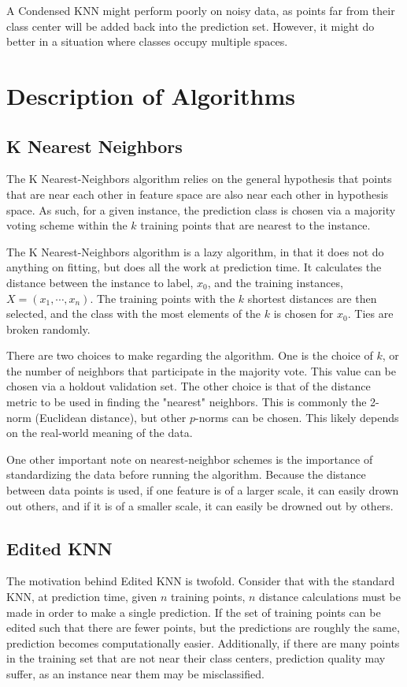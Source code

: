 \documentclass{amsart}
\begin{document}
    A Condensed KNN might perform poorly on noisy
    data, as points far from their class center will be added back into the prediction set.
    However, it might do better in a situation where classes occupy multiple spaces.

    \section{Description of Algorithms}
    \subsection*{K Nearest Neighbors}
    The K Nearest-Neighbors algorithm relies on the general hypothesis that points
    that are near each other in feature space are also near each other in hypothesis space.
    As such, for a given instance, the prediction class is chosen via a majority
    voting scheme within the $k$ training points that are nearest to the instance.

    The K Nearest-Neighbors algorithm is a lazy algorithm, in that it does not
    do anything on fitting, but does all the work at prediction time. It calculates the
    distance between the instance to label, $x_0$, and the training instances, $X = (x_1, \cdots, x_n)$.
    The training points with the $k$ shortest distances are then selected, and the class with the
    most elements of the $k$ is chosen for $x_0$. Ties are broken randomly.

    There are two choices to make regarding the algorithm. One is the choice of $k$, or the number
    of neighbors that participate in the majority vote. This value can be chosen via
    a holdout validation set. The other choice is that of the distance metric to be used in
    finding the "nearest" neighbors. This is commonly the 2-norm (Euclidean distance), but
    other $p$-norms can be chosen. This likely depends on the real-world meaning of the data.

    One other important note on nearest-neighbor schemes is the importance of
    standardizing the data before running the algorithm. Because the distance between
    data points is used, if one feature is of a larger scale, it can easily drown out others, and
    if it is of a smaller scale, it can easily be drowned out by others.

    \subsection*{Edited KNN}
    The motivation behind Edited KNN is twofold. Consider that with the standard KNN, at
    prediction time, given $n$ training points, $n$ distance calculations must be made in order
    to make a single prediction. If the set of training points can be edited such that there are
    fewer points, but the predictions are roughly the same, prediction becomes computationally easier.
    Additionally, if there are many points in the training set that are not near their class
    centers, prediction quality may suffer, as an instance near them may be misclassified.
\end{document}
